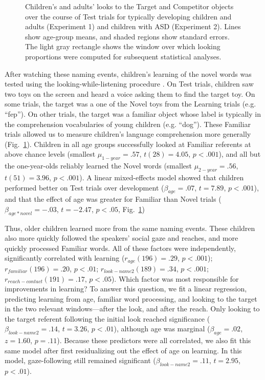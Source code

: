 \documentclass[jou,floatsintext]{apa6}
\begin{document}
\begin{figure}[tb]
	\caption{\label{fig:reflook_timecourse}Children's and adults' looks to the Target and Competitor objects over the course of Test trials for typically developing children and adults (Experiment 1) and children with ASD (Experiment 2). Lines show age-group means, and shaded regions show standard errors. The light gray rectangle shows the window over which looking proportions were computed for subsequent statistical analyses.}
\end{figure}

After watching these naming events, children's learning of the novel words was tested using the looking-while-listening procedure \cite{fernald1998, fernald2008}. On Test trials, children saw two toys on the screen and heard a voice asking them to find the target toy. On some trials, the target was a one of the Novel toys from the Learning trials (e.g. ``fep''). On other trials, the target was a familiar object whose label is typically in the comprehension vocabularies of young children (e.g. ``dog''). These Familiar trials allowed us to measure children's language comprehension more generally (Fig.~\ref{fig:reflook_timecourse}). Children in all age groups successfully looked at Familiar referents at above chance levels (smallest $\mu_{1-year} = .57$, $t(28) = 4.05$, $p < .001$), and all but the one-year-olds reliably learned the Novel words (smallest $\mu_{2-year} = .56$, $t(51) = 3.96$, $p < .001$). A linear mixed-effects model showed that children performed better on Test trials over development ($\beta_{age} = .07$, $t = 7.89$, $p < .001$), and that the effect of age was greater for Familiar than Novel trials ($\beta_{age * novel} = -.03$, $t = -2.47$, $p < .05$, Fig.~\ref{fig:reflook_timecourse})

Thus, older children learned more from the same naming events. These children also more quickly followed the speakers' social gaze and reaches, and more quickly processed Familiar words. All of these factors were independently, significantly correlated with learning ($r_{age}(196) = .29$, $p < .001$); $r_{familiar}(196) = .20$, $p < .01$; $r_{look-name2}(189) = .34$, $p < .001$; $r_{reach-contact}(191) = .17$, $p < .05$). Which factor was most responsible for improvements in learning? To answer this question, we fit a linear regression, predicting learning from age, familiar word processing, and looking to the target in the two relevant windows---after the look, and after the reach. Only looking to the target referent following the initial look reached significance ($\beta_{look-name2} = .14$, $t = 3.26$, $p < .01$), although age was marginal ($\beta_{age} = .02$, $z = 1.60$, $p = .11$). Because these predictors were all correlated, we also fit this same model after first residualizing out the effect of age on learning. In this model, gaze-following still remained significant ($\beta_{look-name2} = .11$, $t = 2.95$, $p < .01$).
\end{document}
